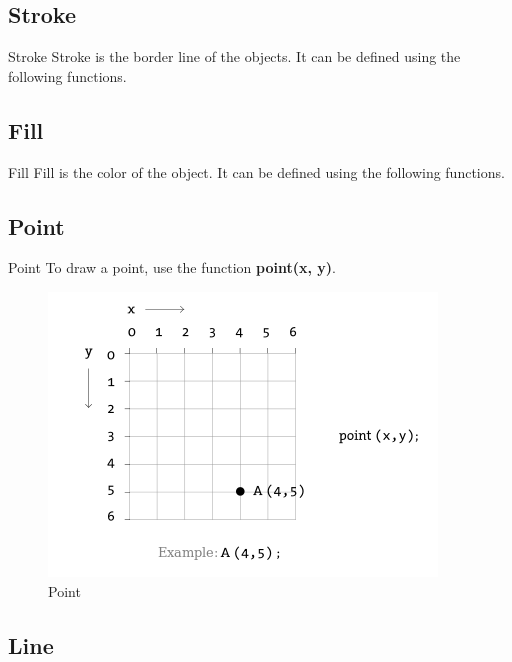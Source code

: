 \documentclass{beamer}
\begin{document}
\subsection{Stroke}

\begin{frame}{Stroke}
Stroke is the border line of the objects. It can be defined using the following functions.\\

\lstStroke
\end{frame}

\subsection{Fill}

\begin{frame}{Fill}
Fill is the color of the object. It can be defined using the following functions.\\

\lstFill
\end{frame}

\subsection{Point}

\begin{frame}{Point}
To draw a point, use the function \textbf{point(x, y)}.

\begin{figure}[H]
\centerline{\includegraphics[scale=0.5]{point.png}}
\caption{Point}
\end{figure}
\end{frame}

\subsection{Line}
\end{document}
